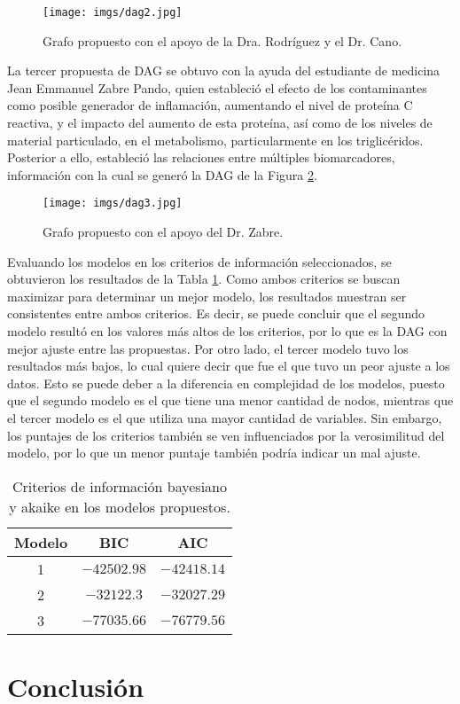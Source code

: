 \documentclass[12pt, letterpaper]{report}
\begin{document}
\begin{figure}[H]
    \centering
    \texttt{[image: imgs/dag2.jpg]}
    \caption{Grafo propuesto con el apoyo de la Dra. Rodríguez y el Dr. Cano.}
    \label{fig:dag2}
\end{figure}

La tercer propuesta de DAG se obtuvo con la ayuda del estudiante de medicina Jean Emmanuel Zabre Pando, quien estableció el efecto de los contaminantes como posible generador de inflamación, aumentando el nivel de proteína C reactiva, y el impacto del aumento de esta proteína, así como de los niveles de material particulado, en el metabolismo, particularmente en los triglicéridos. Posterior a ello, estableció las relaciones entre múltiples biomarcadores, información con la cual se generó la DAG de la Figura \ref{fig:dag3}.

\begin{figure}[H]
    \centering
    \texttt{[image: imgs/dag3.jpg]}
    \caption{Grafo propuesto con el apoyo del Dr. Zabre.}
    \label{fig:dag3}
\end{figure}

Evaluando los modelos en los criterios de información seleccionados, se obtuvieron los resultados de la Tabla \ref{tab:scores}. Como ambos criterios se buscan maximizar para determinar un mejor modelo, los resultados muestran ser consistentes entre ambos criterios. Es decir, se puede concluir que el segundo modelo resultó en los valores más altos de los criterios, por lo que es la DAG con mejor ajuste entre las propuestas. Por otro lado, el tercer modelo tuvo los resultados más bajos, lo cual quiere decir que fue el que tuvo un peor ajuste a los datos. Esto se puede deber a la diferencia en complejidad de los modelos, puesto que el segundo modelo es el que tiene una menor cantidad de nodos, mientras que el tercer modelo es el que utiliza una mayor cantidad de variables. Sin embargo, los puntajes de los criterios también se ven influenciados por la verosimilitud del modelo, por lo que un menor puntaje también podría indicar un mal ajuste.

\begin{table}[H]
    \centering
    \begin{tabular}{|c|c|c|}
        \hline
        Modelo & BIC & AIC \\
        \hline
        1 & $-42502.98$ & $-42418.14$ \\
        \hline
        2 & $-32122.3$ & $-32027.29$ \\
        \hline
        3 & $-77035.66$ & $-76779.56$ \\
        \hline
    \end{tabular}
    \caption{Criterios de información bayesiano y akaike en los modelos propuestos.}
    \label{tab:scores}
\end{table}

\section*{Conclusión}


\printbibliography[title={Referencias}]
\end{document}
